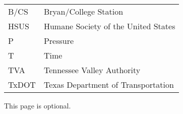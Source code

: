 %

\begin{nomenclature}

\begin{tabular}{ll}
B/CS  & Bryan/College Station\tabularnewline
HSUS & Humane Society of the United States\tabularnewline
P & Pressure\tabularnewline
T  & Time\tabularnewline
TVA & Tennessee Valley Authority\tabularnewline
TxDOT \hfill{}\hfill{}\hfill{}\hfill{}\hfill{}\hfill{}\hfill{}\hfill{} & \multicolumn{1}{l}{Texas Department of Transportation}\tabularnewline
\end{tabular}

\vspace{2em}

This page is optional.

\end{nomenclature}